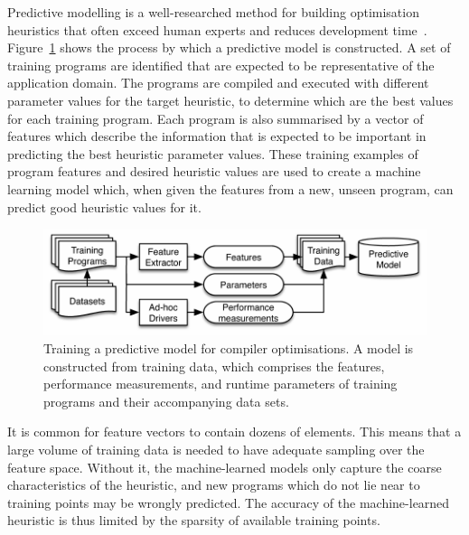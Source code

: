 Predictive modelling is a well-researched method for building optimisation heuristics that often exceed human experts and reduces development time~\cite{Micolet2016,Wang2014c,Magni2014,Cummins2016,Wang2009,Wen2015,Wang2010,Falch2015,Collins2012,Leather2014,Ogilvie2014a}. Figure~\ref{fig:training-a-predictive-model} shows the process by which a predictive model is constructed. A set of training programs are identified that are expected to be representative of the application domain. The programs are compiled and executed with different parameter values for the target heuristic, to determine which are the best values for each training program. Each program is also summarised by a vector of features which describe the information that is expected to be important in predicting the best heuristic parameter values. These training examples of program features and desired heuristic values are used to create a machine learning model which, when given the features from a new, unseen program, can predict good heuristic values for it.

\begin{figure}
  \centering
  \includegraphics[width=0.9\columnwidth]{img/overview-a}%
  \caption[Training a predictive model for compiler optimisations]{%
    Training a predictive model for compiler optimisations. A model is constructed from training data, which comprises the features, performance measurements, and runtime parameters of training programs and their accompanying data sets.%
  }%
  \label{fig:training-a-predictive-model}
\end{figure}

It is common for feature vectors to contain dozens of elements. This means that a large volume of training data is needed to have adequate sampling over the feature space. Without it, the machine-learned models only capture the coarse characteristics of the heuristic, and new programs which do not lie near to training points may be wrongly predicted. The accuracy of the machine-learned heuristic is thus limited by the sparsity of available training points.

